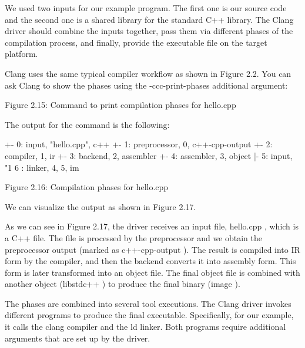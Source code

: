 
We used two inputs for our example program. The first one is our source code and the second one is a shared library for the standard C++ library. The Clang driver should combine the inputs together, pass them via different phases of the compilation process, and finally, provide the executable file on the target platform.

Clang uses the same typical compiler workflow as shown in Figure 2.2. You can ask Clang to show the phases using the -ccc-print-phases additional argument:


\begin{center}
Figure 2.15: Command to print compilation phases for hello.cpp
\end{center}

The output for the command is the following:

\begin{shell}
            +- 0: input, "hello.cpp", c++
         +- 1: preprocessor, {0}, c++-cpp-output
      +- 2: compiler, {1}, ir
   +- 3: backend, {2}, assembler
+- 4: assembler, {3}, object
|- 5: input, "1%
6 : linker, {4, 5}, im
\end{shell}

\begin{center}
Figure 2.16: Compilation phases for hello.cpp
\end{center}

We can visualize the output as shown in Figure 2.17.


As we can see in Figure 2.17, the driver receives an input file, hello.cpp , which is a C++ file. The file is processed by the preprocessor and we obtain the preprocessor output (marked as c++-cpp-output ). The result is compiled into IR form by the compiler, and then the backend converts it into assembly form. This form is later transformed into an object file. The final object file is combined with another object (libstdc++ ) to produce the final binary (image ).


The phases are combined into several tool executions. The Clang driver invokes different programs to produce the final executable. Specifically, for our example, it calls the clang compiler and the ld linker. Both programs require additional arguments that are set up by the driver.

